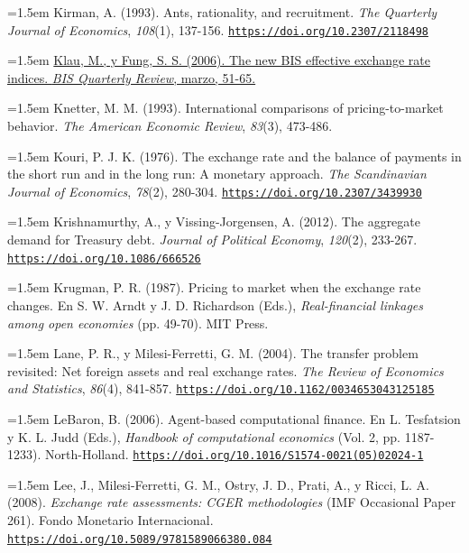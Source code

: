 \documentclass[10pt,a4paper]{article}
\begin{document}
\noindent\hangindent=1.5em Kirman, A. (1993). Ants, rationality, and recruitment. \textit{The Quarterly Journal of Economics}, \textit{108}(1), 137-156. \href{https://doi.org/10.2307/2118498}{\nolinkurl{https://doi.org/10.2307/2118498}}

\noindent\hangindent=1.5em \href{https://www.bis.org/publ/qtrpdf/r_qt0603e.htm}{Klau, M., y Fung, S. S. (2006). The new BIS effective exchange rate indices. \textit{BIS Quarterly Review}, marzo, 51-65.}

\noindent\hangindent=1.5em Knetter, M. M. (1993). International comparisons of pricing-to-market behavior. \textit{The American Economic Review}, \textit{83}(3), 473-486.

\noindent\hangindent=1.5em Kouri, P. J. K. (1976). The exchange rate and the balance of payments in the short run and in the long run: A monetary approach. \textit{The Scandinavian Journal of Economics}, \textit{78}(2), 280-304. \href{https://doi.org/10.2307/3439930}{\nolinkurl{https://doi.org/10.2307/3439930}}

\noindent\hangindent=1.5em Krishnamurthy, A., y Vissing-Jorgensen, A. (2012). The aggregate demand for Treasury debt. \textit{Journal of Political Economy}, \textit{120}(2), 233-267. \href{https://doi.org/10.1086/666526}{\nolinkurl{https://doi.org/10.1086/666526}}

\noindent\hangindent=1.5em Krugman, P. R. (1987). Pricing to market when the exchange rate changes. En S. W. Arndt y J. D. Richardson (Eds.), \textit{Real-financial linkages among open economies} (pp. 49-70). MIT Press.

\noindent\hangindent=1.5em Lane, P. R., y Milesi-Ferretti, G. M. (2004). The transfer problem revisited: Net foreign assets and real exchange rates. \textit{The Review of Economics and Statistics}, \textit{86}(4), 841-857. \href{https://doi.org/10.1162/0034653043125185}{\nolinkurl{https://doi.org/10.1162/0034653043125185}}

\noindent\hangindent=1.5em LeBaron, B. (2006). Agent-based computational finance. En L. Tesfatsion y K. L. Judd (Eds.), \textit{Handbook of computational economics} (Vol. 2, pp. 1187-1233). North-Holland. \href{https://doi.org/10.1016/S1574-0021(05)02024-1}{\nolinkurl{https://doi.org/10.1016/S1574-0021(05)02024-1}}

\noindent\hangindent=1.5em Lee, J., Milesi-Ferretti, G. M., Ostry, J. D., Prati, A., y Ricci, L. A. (2008). \textit{Exchange rate assessments: CGER methodologies} (IMF Occasional Paper 261). Fondo Monetario Internacional. \href{https://doi.org/10.5089/9781589066380.084}{\nolinkurl{https://doi.org/10.5089/9781589066380.084}}
\end{document}
